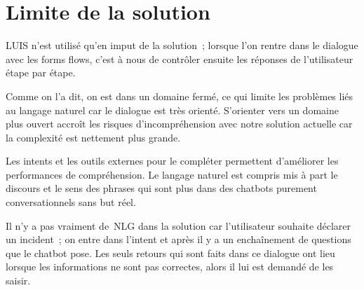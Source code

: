 \section{Limite de la solution}

LUIS n’est utilisé qu’en imput de la solution ;  lorsque l’on rentre dans le dialogue avec les forms flows, c’est à nous de contrôler ensuite les réponses de l’utilisateur étape par étape.
\vspace{1em}

Comme on l’a dit, on est dans un domaine fermé, ce qui limite les problèmes liés au langage naturel car le dialogue est très orienté. S’orienter vers un domaine plus ouvert accroît les risques d’incompréhension avec notre solution actuelle car la complexité est nettement plus grande.
\vspace{1em}

Les intents et les outils externes pour le compléter permettent d’améliorer les performances de compréhension. Le langage naturel est compris mis à part le discours et le sens des phrases qui sont plus dans des chatbots purement conversationnels sans but réel.
\vspace{1em}

Il n’y a pas vraiment de NLG dans la solution car l’utilisateur souhaite déclarer un incident ;  on entre dans l’intent et après il y a un enchaînement de questions que le chatbot pose. Les seuls retours qui sont faits dans ce dialogue ont lieu  lorsque les informations ne sont pas correctes, alors il lui est demandé de les saisir.
